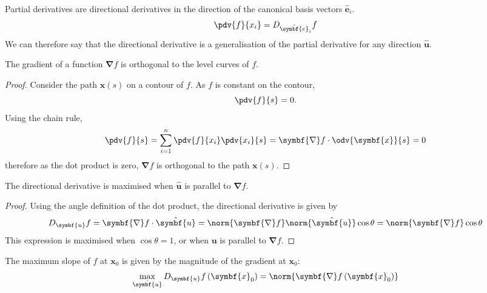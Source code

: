 \documentclass{article}
\begin{document}
\begin{remark}
    Partial derivatives are directional derivatives in the direction of the canonical basis vectors \(\hat{\symbf{e}}_i\).
    \begin{equation*}
        \pdv{f}{x_i} = D_{\hat{\symbf{e}}_i} f
    \end{equation*}
    We can therefore say that the directional derivative is a generalisation of the partial derivative
    for any direction \(\hat{\symbf{u}}\).
\end{remark}
\begin{proposition}
    The gradient of a function \(\symbf{\nabla} f\) is orthogonal to the level curves of \(f\).
\end{proposition}
\begin{proof}
    Consider the path \(\symbf{x}\left( s \right)\) on a contour of \(f\). As \(f\) is constant on the contour,
    \begin{equation*}
        \pdv{f}{s} = 0.
    \end{equation*}
    Using the chain rule,
    \begin{equation*}
        \pdv{f}{s} = \sum_{i = 1}^n \pdv{f}{x_i} \pdv{x_i}{s} = \symbf{\nabla} f \cdot \odv{\symbf{x}}{s} = 0
    \end{equation*}
    therefore as the dot product is zero, \(\symbf{\nabla} f\) is orthogonal to the path \(\symbf{x}\left( s \right)\).
\end{proof}
\begin{proposition}
    The directional derivative is maximised when \(\hat{\symbf{u}}\) is parallel to \(\symbf{\nabla} f\).
\end{proposition}
\begin{proof}
    Using the angle definition of the dot product, the directional derivative is given by
    \begin{equation*}
        D_{\symbf{u}} f = \symbf{\nabla} f \cdot \hat{\symbf{u}} = \norm{\symbf{\nabla} f} \norm{\hat{\symbf{u}}} \cos{\theta} = \norm{\symbf{\nabla} f} \cos{\theta}
    \end{equation*}
    This expression is maximised when \(\cos{\theta} = 1\), or when \(\symbf{u}\) is parallel to \(\symbf{\nabla} f\).
\end{proof}
\begin{remark}
    The maximum slope of \(f\) at \(\symbf{x}_0\) is given by the magnitude of the gradient at \(\symbf{x}_0\):
    \begin{equation*}
        \max_{\hat{\symbf{u}}} D_{\symbf{u}} f\left( \symbf{x}_0 \right) = \norm{\symbf{\nabla} f\left( \symbf{x}_0 \right)}
    \end{equation*}
\end{remark}
\end{document}
